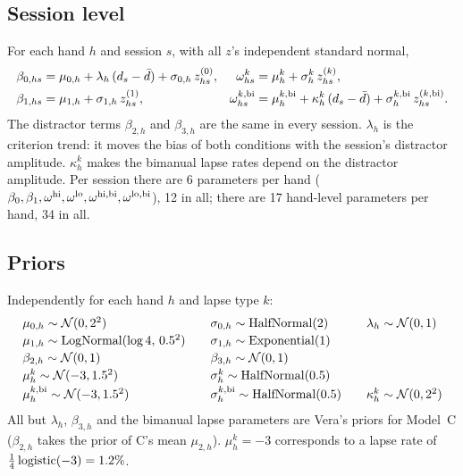 \subsection{Session level}
For each hand $h$ and session $s$, with all $z$'s independent standard normal,
\begin{align*}
\beta_{0,hs} &= \mu_{0,h} + \lambda_h\,(d_s-\bar d) + \sigma_{0,h}\,z^{(0)}_{hs}, &
\omega^{k}_{hs} &= \mu^{k}_{h} + \sigma^{k}_{h}\,z^{(k)}_{hs},\\
\beta_{1,hs} &= \mu_{1,h} + \sigma_{1,h}\,z^{(1)}_{hs}, &
\omega^{k,\mathrm{bi}}_{hs} &= \mu^{k,\mathrm{bi}}_{h} + \kappa^{k}_{h}\,(d_s-\bar d) + \sigma^{k,\mathrm{bi}}_{h}\,z^{(k,\mathrm{bi})}_{hs}.
\end{align*}
The distractor terms $\beta_{2,h}$ and $\beta_{3,h}$ are the same in every session.
$\lambda_h$ is the criterion trend: it moves the bias of both conditions with the session's distractor amplitude.
$\kappa^k_h$ makes the bimanual lapse rates depend on the distractor amplitude.
Per session there are 6 parameters per hand ($\beta_0,\beta_1,\omega^{\mathrm{hi}},\omega^{\mathrm{lo}},\omega^{\mathrm{hi},\mathrm{bi}},\omega^{\mathrm{lo},\mathrm{bi}}$), 12 in all; there are 17 hand-level parameters per hand, 34 in all.

\subsection{Priors}
Independently for each hand $h$ and lapse type $k$:
\[
\begin{array}{@{}l@{\qquad}l@{\qquad}l@{}}
\mu_{0,h}\sim\N(0,2^2) & \sigma_{0,h}\sim\HN(2) & \lambda_h\sim\N(0,1)\\[2pt]
\mu_{1,h}\sim\operatorname{LogNormal}(\log 4,\,0.5^2) & \sigma_{1,h}\sim\operatorname{Exponential}(1) & \\[2pt]
\beta_{2,h}\sim\N(0,1) & \beta_{3,h}\sim\N(0,1) & \\[2pt]
\mu^{k}_{h}\sim\N(-3,1.5^2) & \sigma^{k}_{h}\sim\HN(0.5) & \\[2pt]
\mu^{k,\bi}_{h}\sim\N(-3,1.5^2) & \sigma^{k,\bi}_{h}\sim\HN(0.5) & \kappa^{k}_{h}\sim\N(0,2^2)
\end{array}
\]
All but $\lambda_h$, $\beta_{3,h}$ and the bimanual lapse parameters are Vera's priors for Model~C ($\beta_{2,h}$ takes the prior of C's mean $\mu_{2,h}$).
$\mu^k_h=-3$ corresponds to a lapse rate of $\tfrac14\operatorname{logistic}(-3)=1.2\%$.

